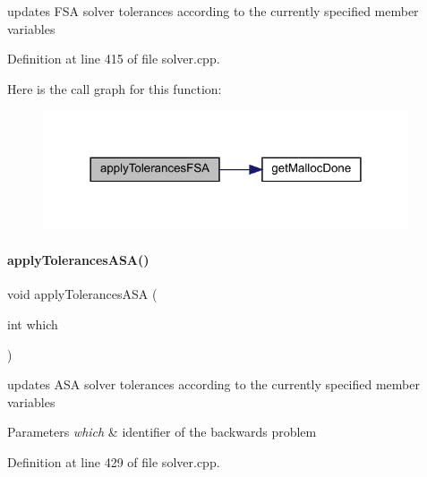 updates F\+SA solver tolerances according to the currently specified member variables 

Definition at line 415 of file solver.\+cpp.

Here is the call graph for this function\+:
\nopagebreak
\begin{figure}[H]
\begin{center}
\leavevmode
\includegraphics[width=306pt]{classamici_1_1_solver_a45ec22a0fddb6a8b37a3c3fdbdf7374f_cgraph}
\end{center}
\end{figure}
\mbox{\label{classamici_1_1_solver_abdf8989d57153fde8988e73a98979297}} 
\paragraph{\texorpdfstring{apply\+Tolerances\+A\+S\+A()}{applyTolerancesASA()}}
{\footnotesize\ttfamily void apply\+Tolerances\+A\+SA (\begin{DoxyParamCaption}\item[{int}]{which }\end{DoxyParamCaption})\hspace{0.3cm}{\ttfamily [protected]}}

updates A\+SA solver tolerances according to the currently specified member variables


\begin{DoxyParams}{Parameters}
{\em which} & identifier of the backwards problem \\
\hline
\end{DoxyParams}


Definition at line 429 of file solver.\+cpp.

